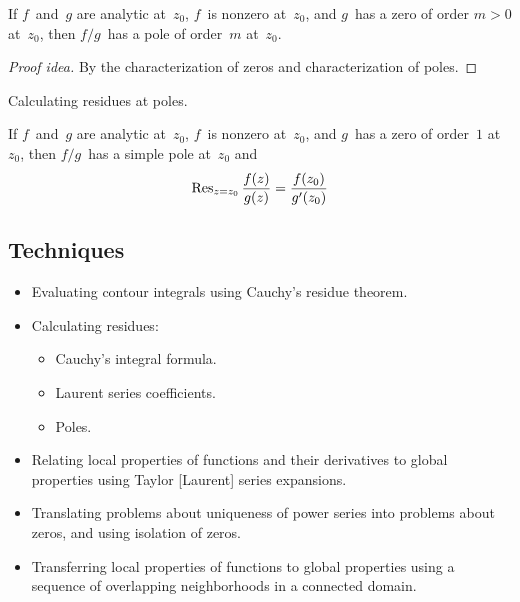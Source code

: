 \begin{thm}
If \(f\)~and~\(g\) are analytic at~\(z_0\), \(f\)~is nonzero at~\(z_0\), and \(g\)~has a zero of order \(m>0\) at~\(z_0\), then \(f/g\)~has a pole of order~\(m\) at~\(z_0\).
\end{thm}
\begin{proof}[Proof idea]
By the characterization of zeros and characterization of poles.
\end{proof}
\begin{app}
Calculating residues at poles.
\end{app}

\begin{cor}
If \(f\)~and~\(g\) are analytic at~\(z_0\), \(f\)~is nonzero at~\(z_0\), and \(g\)~has a zero of order~\(1\) at~\(z_0\), then \(f/g\)~has a simple pole at~\(z_0\) and
\[\operatorname{Res}_{z=z_0}\frac{f(z)}{g(z)}=\frac{f(z_0)}{g'(z_0)}\]
\end{cor}

\subsection*{Techniques}
\begin{itemize}[itemsep=0pt]
\item Evaluating contour integrals using Cauchy's residue theorem.
\item Calculating residues:
\begin{itemize}[itemsep=0pt]
\item Cauchy's integral formula.
\item Laurent series coefficients.
\item Poles.
\end{itemize}
\item Relating local properties of functions and their derivatives to global properties using Taylor [Laurent] series expansions.
\item Translating problems about uniqueness of power series into problems about zeros, and using isolation of zeros.
\item Transferring local properties of functions to global properties using a sequence of overlapping neighborhoods in a connected domain.
\end{itemize}
